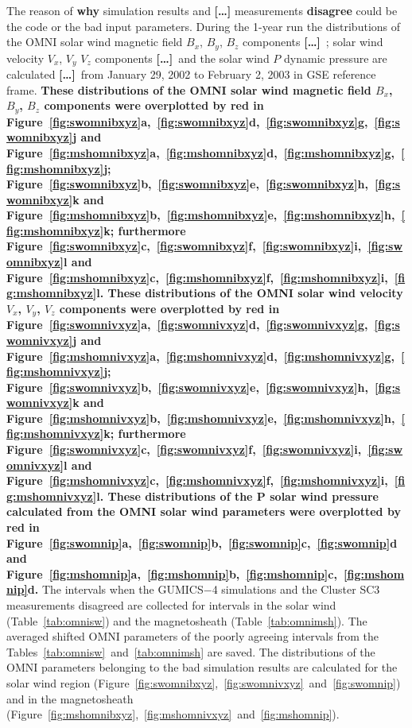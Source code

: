 \documentclass[linenumbers,draft]{agujournal}
\newcommand{\del}{\textbf{[\dots]}\ } %
\begin{document}
The reason of \textbf{why} simulation results and \textbf{[\dots]} measurements \textbf{disagree} could be the code or the bad input parameters. During the 1-year run the distributions of the OMNI solar wind magnetic field $B_{x}$, $B_{y}$, $B_{z}$ components \del; solar wind velocity $V_{x}$, $V_{y}$ $V_{z}$ components \del and the solar wind $P$ dynamic pressure are calculated \del from January 29, 2002 to February 2, 2003 in GSE reference frame. \textbf{These distributions of the OMNI solar wind magnetic field $B_{x}$, $B_{y}$, $B_{z}$ components were overplotted by red in Figure~\ref{fig:swomnibxyz}a,~\ref{fig:swomnibxyz}d,~\ref{fig:swomnibxyz}g,~\ref{fig:swomnibxyz}j and Figure~\ref{fig:mshomnibxyz}a,~\ref{fig:mshomnibxyz}d,~\ref{fig:mshomnibxyz}g,~\ref{fig:mshomnibxyz}j; Figure~\ref{fig:swomnibxyz}b,~\ref{fig:swomnibxyz}e,~\ref{fig:swomnibxyz}h,~\ref{fig:swomnibxyz}k and Figure~\ref{fig:mshomnibxyz}b,~\ref{fig:mshomnibxyz}e,~\ref{fig:mshomnibxyz}h,~\ref{fig:mshomnibxyz}k; furthermore Figure~\ref{fig:swomnibxyz}c,~\ref{fig:swomnibxyz}f,~\ref{fig:swomnibxyz}i,~\ref{fig:swomnibxyz}l and Figure~\ref{fig:mshomnibxyz}c,~\ref{fig:mshomnibxyz}f,~\ref{fig:mshomnibxyz}i,~\ref{fig:mshomnibxyz}l. These distributions of the OMNI solar wind velocity $V_{x}$, $V_{y}$, $V_{z}$ components were overplotted by red in Figure~\ref{fig:swomnivxyz}a,~\ref{fig:swomnivxyz}d,~\ref{fig:swomnivxyz}g,~\ref{fig:swomnivxyz}j and Figure~\ref{fig:mshomnivxyz}a,~\ref{fig:mshomnivxyz}d,~\ref{fig:mshomnivxyz}g,~\ref{fig:mshomnivxyz}j; Figure~\ref{fig:swomnivxyz}b,~\ref{fig:swomnivxyz}e,~\ref{fig:swomnivxyz}h,~\ref{fig:swomnivxyz}k and Figure~\ref{fig:mshomnivxyz}b,~\ref{fig:mshomnivxyz}e,~\ref{fig:mshomnivxyz}h,~\ref{fig:mshomnivxyz}k; furthermore Figure~\ref{fig:swomnivxyz}c,~\ref{fig:swomnivxyz}f,~\ref{fig:swomnivxyz}i,~\ref{fig:swomnivxyz}l and Figure~\ref{fig:mshomnivxyz}c,~\ref{fig:mshomnivxyz}f,~\ref{fig:mshomnivxyz}i,~\ref{fig:mshomnivxyz}l. These distributions of the P solar wind pressure calculated from the OMNI solar wind parameters were overplotted by red in Figure~\ref{fig:swomnip}a,~\ref{fig:swomnip}b,~\ref{fig:swomnip}c,~\ref{fig:swomnip}d and Figure~\ref{fig:mshomnip}a,~\ref{fig:mshomnip}b,~\ref{fig:mshomnip}c,~\ref{fig:mshomnip}d.} The intervals when the GUMICS$-$4 simulations and the Cluster SC3 measurements disagreed are collected for intervals in the solar wind (Table~\ref{tab:omnisw}) and the magnetosheath (Table~\ref{tab:omnimsh}). The averaged shifted OMNI parameters of the poorly agreeing intervals from the Tables~\ref{tab:omnisw}~and~\ref{tab:omnimsh} are saved. The distributions of the OMNI parameters belonging to the bad simulation results are calculated for the solar wind region (Figure~\ref{fig:swomnibxyz},~\ref{fig:swomnivxyz}~and~\ref{fig:swomnip}) and in the magnetosheath (Figure~\ref{fig:mshomnibxyz},~\ref{fig:mshomnivxyz}~and~\ref{fig:mshomnip}).
\end{document}
